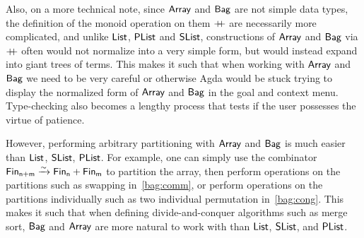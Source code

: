 Also, on a more technical note, since $\operatorname{\mathsf{Array}}$ and $\operatorname{\mathsf{Bag}}$ are not simple data types, the definition of
the monoid operation on them $\mathbin{+\kern -0.4em+}$ are necessarily more complicated, and unlike $\operatorname{\mathsf{List}}$, $\operatorname{\mathsf{PList}}$
and $\operatorname{\mathsf{SList}}$, constructions of $\operatorname{\mathsf{Array}}$ and $\operatorname{\mathsf{Bag}}$ via $\mathbin{+\kern -0.4em+}$ often would not normalize into a
very simple form, but would instead expand into giant trees of terms. This makes it such that when working
with $\operatorname{\mathsf{Array}}$ and $\operatorname{\mathsf{Bag}}$ we need to be very careful or otherwise Agda would be stuck trying to display
the normalized form of $\operatorname{\mathsf{Array}}$ and $\operatorname{\mathsf{Bag}}$ in the goal and context menu. Type-checking also becomes a lengthy
process that tests if the user possesses the virtue of patience.

However, performing arbitrary partitioning with $\operatorname{\mathsf{Array}}$ and $\operatorname{\mathsf{Bag}}$ is much easier than
$\operatorname{\mathsf{List}}$, $\operatorname{\mathsf{SList}}$, $\operatorname{\mathsf{PList}}$. For example,
one can simply use the combinator ${\Fin[n+m] \xto{\sim} \Fin[n] + \Fin[m]}$ to partition the array,
then perform operations on the partitions such as swapping in~\cref{bag:comm},
or perform operations on the partitions individually such as two individual permutation in~\cref{bag:cong}.
This makes it such that when defining divide-and-conquer algorithms such as merge sort,
$\operatorname{\mathsf{Bag}}$ and $\operatorname{\mathsf{Array}}$ are more natural to work with than $\operatorname{\mathsf{List}}$, $\operatorname{\mathsf{SList}}$, and $\operatorname{\mathsf{PList}}$.

